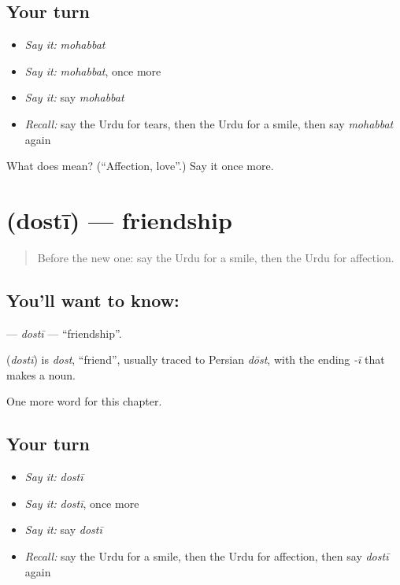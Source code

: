 \subsection*{Your turn}
\begin{itemize}
\raggedright
  \item \emph{Say it:} \emph{mohabbat}
  \item \emph{Say it:} \emph{mohabbat}, once more
  \item \emph{Say it:} say \emph{mohabbat}
  \item \emph{Recall:} say the Urdu for tears, then the Urdu for a smile, then say \emph{mohabbat} again
\end{itemize}

\begin{tcolorbox}[breakable,colback=teal!4,colframe=teal!35!black,title={Before you move on}]
What does  mean? (\textquotedblleft{}Affection, love\textquotedblright{}.) Say it once more.
\end{tcolorbox}
\section[\texorpdfstring{\ur{دوستی} (dostī)}{دوستی (dostī)}]{ (dostī) — friendship}

\label{lesson:UR-C257-dosti}



\begin{quote}
Before the new one: say the Urdu for a smile, then the Urdu for affection.
\end{quote}

\subsection*{You'll want to know: }
\textbf{} — \emph{dostī} — \textquotedblleft{}friendship\textquotedblright{}.

\begin{cousinweb}
\textbf{} (\emph{dostī}) is \emph{dost}, \textquotedblleft{}friend\textquotedblright{}, usually traced to Persian \emph{dōst}, with the ending \emph{-ī} that makes a noun.
\end{cousinweb}

\begin{grammarlens}[title={What you've built}]
One more word for this chapter.
\end{grammarlens}

\subsection*{Your turn}
\begin{itemize}
\raggedright
  \item \emph{Say it:} \emph{dostī}
  \item \emph{Say it:} \emph{dostī}, once more
  \item \emph{Say it:} say \emph{dostī}
  \item \emph{Recall:} say the Urdu for a smile, then the Urdu for affection, then say \emph{dostī} again
\end{itemize}

